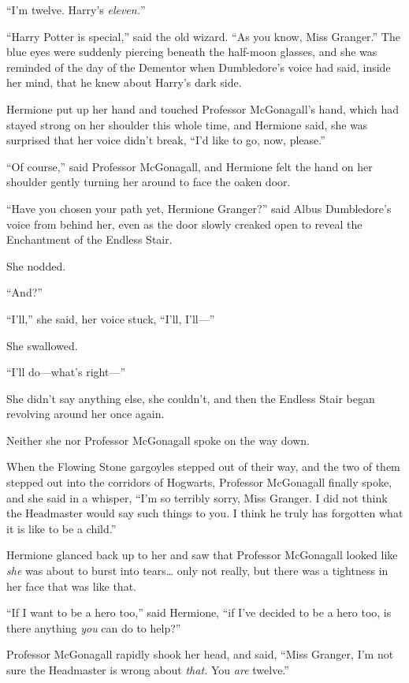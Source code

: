``I'm twelve. Harry's \emph{eleven.}''

``Harry Potter is special,'' said the old wizard. ``As you know, Miss
Granger.'' The blue eyes were suddenly piercing beneath the half-moon
glasses, and she was reminded of the day of the Dementor when
Dumbledore's voice had said, inside her mind, that he knew about Harry's
dark side.

Hermione put up her hand and touched Professor McGonagall's hand, which
had stayed strong on her shoulder this whole time, and Hermione said,
she was surprised that her voice didn't break, ``I'd like to go, now,
please.''

``Of course,'' said Professor McGonagall, and Hermione felt the hand on
her shoulder gently turning her around to face the oaken door.

``Have you chosen your path yet, Hermione Granger?'' said Albus
Dumbledore's voice from behind her, even as the door slowly creaked open
to reveal the Enchantment of the Endless Stair.

She nodded.

``And?''

``I'll,'' she said, her voice stuck, ``I'll, I'll---''

She swallowed.

``I'll do---what's right---''

She didn't say anything else, she couldn't, and then the Endless Stair
began revolving around her once again.

Neither she nor Professor McGonagall spoke on the way down.

When the Flowing Stone gargoyles stepped out of their way, and the two
of them stepped out into the corridors of Hogwarts, Professor McGonagall
finally spoke, and she said in a whisper, ``I'm so terribly sorry, Miss
Granger. I did not think the Headmaster would say such things to you. I
think he truly has forgotten what it is like to be a child.''

Hermione glanced back up to her and saw that Professor McGonagall looked
like \emph{she} was about to burst into tears\ldots{} only not really,
but there was a tightness in her face that was like that.

``If I want to be a hero too,'' said Hermione, ``if I've decided to be a
hero too, is there anything \emph{you} can do to help?''

Professor McGonagall rapidly shook her head, and said, ``Miss Granger,
I'm not sure the Headmaster is wrong about \emph{that.} You \emph{are}
twelve.''

